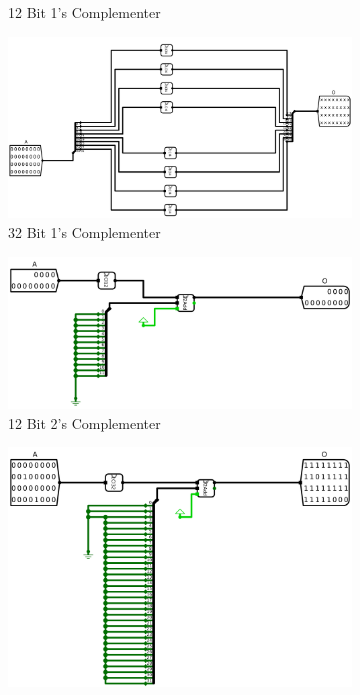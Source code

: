 \documentclass[12pt]{article}
\begin{document}
\begin{figure}[H]
\begin{subfigure}[b]{0.3\textwidth}
        \caption{12 Bit 1's Complementer}
        \label{fig:12bitcompl}
    \end{subfigure}
    \begin{subfigure}[b]{0.3\textwidth}
        \includegraphics[width=\textwidth]{Images/1Compl32.png}
        \caption{32 Bit 1's Complementer}
        \label{fig:32bitcompl}
    \end{subfigure}
    \newline
    \newline
    \begin{subfigure}[b]{0.3\textwidth}
        \includegraphics[width=\textwidth]{Images/2Compl12.png}
        \caption{12 Bit 2's Complementer}
        \label{fig:12bit2compl}
    \end{subfigure}
    \begin{subfigure}[b]{0.3\textwidth}
        \includegraphics[width=\textwidth]{Images/2Compl32.png}

\end{subfigure}
\end{figure}
\end{document}

